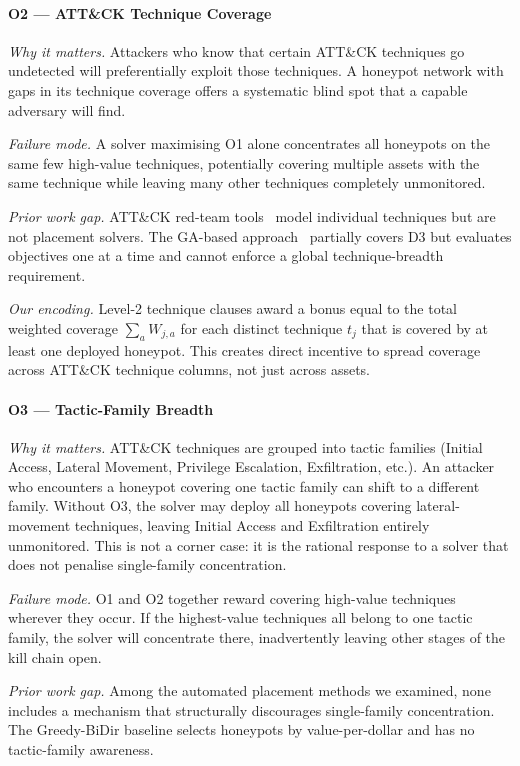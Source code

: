 \documentclass[journal]{IEEEtran}
\begin{document}
\paragraph{O2 --- ATT\&CK Technique Coverage}
\textit{Why it matters.}
Attackers who know that certain ATT\&CK techniques go undetected will
preferentially exploit those techniques. A honeypot network with gaps
in its technique coverage offers a systematic blind spot that a
capable adversary will find.

\textit{Failure mode.}
A solver maximising O1 alone concentrates all honeypots on the same
few high-value techniques, potentially covering multiple assets with
the same technique while leaving many other techniques completely
unmonitored.

\textit{Prior work gap.}
ATT\&CK red-team tools~\cite{applebaum2016} model individual
techniques but are not placement solvers. The GA-based
approach~\cite{hemberg2018} partially covers D3 but evaluates
objectives one at a time and cannot enforce a global technique-breadth
requirement.

\textit{Our encoding.}
Level-2 technique clauses award a bonus equal to the total weighted
coverage $\sum_a W_{j,a}$ for each distinct technique $t_j$ that is
covered by at least one deployed honeypot. This creates direct
incentive to spread coverage across ATT\&CK technique columns, not
just across assets.

\paragraph{O3 --- Tactic-Family Breadth}
\textit{Why it matters.}
ATT\&CK techniques are grouped into tactic families (Initial Access,
Lateral Movement, Privilege Escalation, Exfiltration, etc.). An
attacker who encounters a honeypot covering one tactic family can
shift to a different family. Without O3, the solver may deploy all
honeypots covering lateral-movement techniques, leaving Initial
Access and Exfiltration entirely unmonitored. This is not a corner
case: it is the rational response to a solver that does not penalise
single-family concentration.

\textit{Failure mode.}
O1 and O2 together reward covering high-value techniques wherever
they occur. If the highest-value techniques all belong to one tactic
family, the solver will concentrate there, inadvertently leaving
other stages of the kill chain open.

\textit{Prior work gap.}
Among the automated placement methods we examined, none includes a
mechanism that structurally discourages single-family concentration.
The Greedy-BiDir baseline selects honeypots by value-per-dollar and
has no tactic-family awareness.
\end{document}
